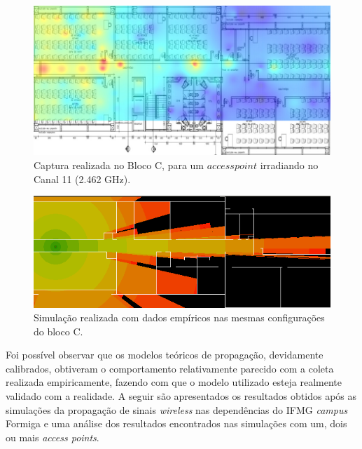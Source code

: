 \documentclass[
	12pt,				%
	twoside,			%
	a4paper,			%
	english,			%
	french,				%
	spanish,			%
	brazil				%
	]{abntex2}
\begin{document}
\begin{figure}[ht]
    \caption{\label{captura} Captura realizada no Bloco C, para um $access point$ irradiando no Canal 11 (2.462 GHz).}
    \begin{center}
        \includegraphics[scale=0.5]{imagens/captura-vinicius.jpg}
    \end{center}
\end{figure}
\begin{figure}[ht]
    \caption{\label{simulacao_vinicius} Simulação realizada com dados empíricos nas mesmas configurações do bloco C.}
    \begin{center}
        \includegraphics[scale=0.7]{imagens/simulacao_vinicius.png}
    \end{center}
\end{figure}

Foi possível observar que os modelos teóricos de propagação, devidamente
calibrados, obtiveram o comportamento relativamente parecido com a
coleta realizada empiricamente, fazendo com que o modelo utilizado
esteja realmente validado com a realidade. A seguir são apresentados os
resultados obtidos após as simulações da propagação de sinais
\emph{wireless} nas dependências do IFMG \emph{campus} Formiga e uma
análise dos resultados encontrados nas simulações com um, dois ou mais
\emph{access points}.
\end{document}
